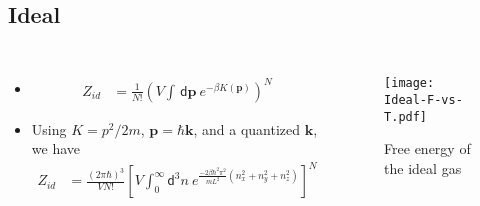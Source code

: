 \documentclass{beamer}
\newcommand*{\diff}{\mathsf{d}}
\begin{document}
\subsection*{Ideal}
\begin{frame}
	\begin{columns}[t]
			\begin{itemize}
				\item \begin{align*}
					Z_{id} &= \frac{1}{N!}\left(V\int \,\diff\mathbf{p}~e^{-\beta K(\mathbf{p})}\right)^{N}	 	
				\end{align*}
				\item Using $K = p^2/2m$, $\mathbf{p}=\hbar \mathbf{k}$, and a quantized $\mathbf{k}$, we have
				\begin{align*}
				Z_{id} &= \frac{(2\pi\hbar)^3}{V N!}\left[V \int_0^\infty \diff^3 n ~e^{ \frac{-2\beta \hbar^2\pi^2}{mL^2}(n_x^2 + n_y^2 + n_z^2)}\right]^{N} 	
				\end{align*} 
			\end{itemize}
			\begin{figure}
 				\texttt{[image: Ideal-F-vs-T.pdf]}
 				\caption{\tiny Free energy of the ideal gas}
 				\label{ideal}
 			\end{figure}
	\end{columns}
\end{frame}
\end{document}
